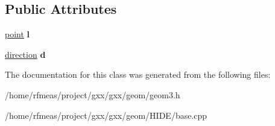 \subsection*{Public Attributes}
\begin{DoxyCompactItemize}
\item 
\hyperlink{classgxx_1_1geom3_1_1point}{point} {\bfseries l}\hypertarget{classgxx_1_1geom3_1_1axis_a346d41bf4307d5876fa230ee778973e7}{}\label{classgxx_1_1geom3_1_1axis_a346d41bf4307d5876fa230ee778973e7}

\item 
\hyperlink{classgxx_1_1geom3_1_1direction}{direction} {\bfseries d}\hypertarget{classgxx_1_1geom3_1_1axis_a096551f9e9c6dfff8366fc12ea4d6450}{}\label{classgxx_1_1geom3_1_1axis_a096551f9e9c6dfff8366fc12ea4d6450}

\end{DoxyCompactItemize}


The documentation for this class was generated from the following files\+:\begin{DoxyCompactItemize}
\item 
/home/rfmeas/project/gxx/gxx/geom/geom3.\+h\item 
/home/rfmeas/project/gxx/gxx/geom/\+H\+I\+D\+E/base.\+cpp\end{DoxyCompactItemize}
